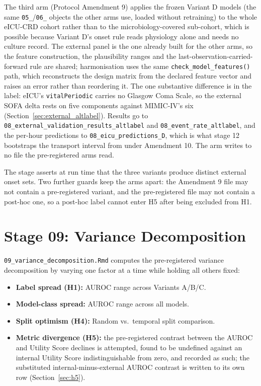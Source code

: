 The third arm (Protocol Amendment 9) applies the frozen Variant D
models (the same \texttt{05\_}/\texttt{06\_} objects the other arms use,
loaded without retraining) to the whole eICU-CRD cohort rather than to the
microbiology-covered sub-cohort, which is possible because Variant D's onset
rule reads physiology alone and needs no culture record. The external panel is
the one already built for the other arms, so the feature construction, the
plausibility ranges and the last-observation-carried-forward rule are shared;
harmonisation uses the same \texttt{check\_model\_features()} path, which
reconstructs the design matrix from the declared feature vector and raises an
error rather than reordering it. The one substantive difference is in the
label: eICU's \texttt{vitalPeriodic} carries no Glasgow Coma
Scale, so the external SOFA delta rests on five components against MIMIC-IV's
six (Section~\ref{sec:external_altlabel}). Results go to
\texttt{08\_external\_validation\_results\_altlabel} and
\texttt{08\_event\_rate\_altlabel}, and the per-hour predictions to
\texttt{08\_eicu\_predictions\_D}, which is what stage 12 bootstraps the
transport interval from under Amendment 10. The arm writes to no file the
pre-registered arms read.

The stage asserts at run time that the three variants produce distinct external
onset sets. Two further guards keep the arms apart: the Amendment 9 file may
not contain a pre-registered variant, and the pre-registered file may not
contain a post-hoc one, so a post-hoc label cannot enter H5 after being
excluded from H1.


\section{Stage 09: Variance Decomposition}

\texttt{09\_variance\_decomposition.Rmd} computes the pre-registered variance
decomposition by varying one factor at a time while holding all others fixed:

\begin{itemize}
    \item \textbf{Label spread (H1):} AUROC range across Variants A/B/C.
    \item \textbf{Model-class spread:} AUROC range across all models.
    \item \textbf{Split optimism (H4):} Random vs.\ temporal split comparison.
    \item \textbf{Metric divergence (H5):} the pre-registered contrast between
    the AUROC and Utility Score declines is attempted, found to be undefined
    against an internal Utility Score indistinguishable from zero, and recorded
    as such; the substituted internal-minus-external AUROC contrast is written
    to its own row (Section~\ref{sec:h5}).
\end{itemize}

